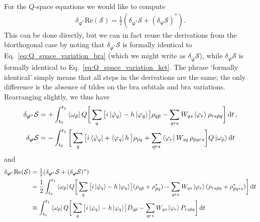 \documentclass[aip,jcp,preprint,superscriptaddress,nofootinbib]{revtex4-1}
\begin{document}
For the $Q$-space equations we would like to compute 
\begin{align}
    \delta_{\bm{\varphi}^*} \mathrm{Re}(\mathcal{S}) 
    = \tfrac{1}{2} (\delta_{\bm{\varphi}^*} \mathcal{S} + (\delta_{\bm{\varphi}} \mathcal{S})^*).
\end{align}
This can be done directly, but we can in fact reuse the derivations from the biorthogonal case
by noting that $\delta_{\bm{\varphi}^*} \mathcal{S}$ is formally identical
to Eq.~\eqref{eq:Q_space_variation_bra} (which we might write as $\delta_{\tilde{\bm{\varphi}}} \mathcal{S}$),
while $\delta_{\bm{\varphi}} \mathcal{S}$ is formally identical to Eq.~\eqref{eq:Q_space_variation_ket}.
The phrase `formally identical' simply means that all steps in the derivations are the same;
the only difference is the absence of tildes on the bra orbitals and bra variations. 
Rearranging slightly, we thus have
\begin{subequations}
    \begin{align}
        \delta_{\bm{\varphi}^*} \mathcal{S} 
        &=
        +\int_{t_0}^{t_1}
        \bra{\omega_{\bar{p}}} Q
        \bigg[
            \sum_{q} \big[ i \ket{\dot{\varphi}_{q}} - h \ket{\varphi_{q}} \mspace{-2mu} \big] \rho_{q\bar{p}}
            - \sum_{qrs} W_{qs} \ket{\varphi_{r}} \rho_{rs\bar{p}q}
        \bigg] \dd{t}, \\
        \delta_{\bm{\varphi}} \mathcal{S}
        &=
        -\int_{t_0}^{t_1}
        \bigg[
            \sum_{q} \big[ i \bra{\dot{\varphi}_{q}} + \bra{\varphi_{q}} h \, \big] \rho_{\bar{p}q}
            + \sum_{qrs} \bra{\varphi_{r}} W_{sq} \, \rho_{\bar{p}qrs}
        \bigg] Q \ket{\omega_{\bar{p}}} \dd{t}
    \end{align}
\end{subequations}
and
\begin{align}
    \delta_{\bm{\varphi}^*} \mathrm{Re}(\mathcal{S})
    &= \tfrac{1}{2} (\delta_{\bm{\varphi}^*} \mathcal{S} + (\delta_{\bm{\varphi}} \mathcal{S})^*) \nonumber\\
    &=
    \frac{1}{2} \int_{t_0}^{t_1}
        \bra{\omega_{\bar{p}}} Q
        \bigg[
            \sum_{q} \big[ i \ket{\dot{\varphi}_{q}} - h \ket{\varphi_{q}} \mspace{-2mu} \big] ( \rho_{q\bar{p}} + \rho_{\bar{p}q}^* )
            - \sum_{qrs} W_{qs} \ket{\varphi_{r}} ( \rho_{rs\bar{p}q} + \rho_{\bar{p}qrs}^* )
        \bigg] \dd{t} \nonumber\\
    &\equiv
    \int_{t_0}^{t_1}
        \bra{\omega_{\bar{p}}} Q
        \bigg[
            \sum_{q} \big[ i \ket{\dot{\varphi}_{q}} - h \ket{\varphi_{q}} \mspace{-2mu} \big] D_{q\bar{p}}
            - \sum_{qrs} W_{qs} \ket{\varphi_{r}} P_{rs\bar{p}q}
        \bigg] \dd{t}
\end{align}
\end{document}
